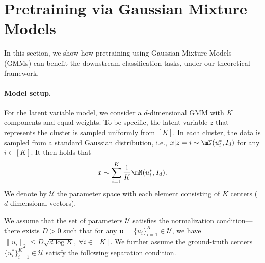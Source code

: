 \section{Pretraining via Gaussian Mixture Models}\label{gmm}
In this section, we show how pretraining using Gaussian Mixture Models (GMMs) can benefit the downstream classification tasks, under our theoretical framework.

\paragraph{Model setup.}
For the latent variable model, we consider a $d$-dimensional GMM with $K$ components and equal weights. To be specific, the latent variable $z$ that represents the cluster is sampled uniformly from $[K]$. In each cluster, the data is sampled from a standard Gaussian distribution, i.e., $x|z=i\sim\mN(u^* _i,I_d)$ for any $i\in[K]$. It then holds that
\begin{equation*}
x\sim\sum^K_{i=1}\frac{1}{K}\mN(u^* _i,I_d).
\end{equation*}
We denote by $\mathcal{U}$ the parameter space with each element consisting of $K$ centers ($d$-dimensional vectors). 

We assume that the set of parameters $\mathcal{U}$ satisfies the normalization condition---there exists $D>0$ such that for any $\mathbf{u}=\{u_i\}^K_{i=1}\in\mathcal{U}$, we have $\|u_i\|_2\leq D\sqrt{d\log K},~\forall i\in[K]$. We further assume the ground-truth centers $\{u^* _i\}^K_{i=1}\in\mathcal{U}$ satisfy the following separation condition.

